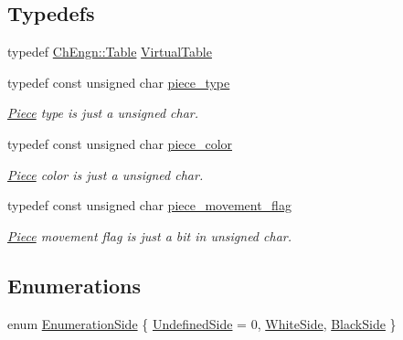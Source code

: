 \subsection*{Typedefs}
\begin{DoxyCompactItemize}
\item 
typedef \hyperlink{classChEngn_1_1Table}{ChEngn::Table} \hyperlink{namespaceChEngn_a5ba229504d25ed1b2086f1df62f6db41}{VirtualTable}
\item 
\hypertarget{namespaceChEngn_a2a35c185f259757a78e937575b8ed483}{
typedef const unsigned char \hyperlink{namespaceChEngn_a2a35c185f259757a78e937575b8ed483}{piece\_\-type}}
\label{namespaceChEngn_a2a35c185f259757a78e937575b8ed483}

\begin{DoxyCompactList}\small\item\em \hyperlink{classChEngn_1_1Piece}{Piece} type is just a unsigned char. \item\end{DoxyCompactList}\item 
\hypertarget{namespaceChEngn_a9c81426c0134a97288a226c122daf62f}{
typedef const unsigned char \hyperlink{namespaceChEngn_a9c81426c0134a97288a226c122daf62f}{piece\_\-color}}
\label{namespaceChEngn_a9c81426c0134a97288a226c122daf62f}

\begin{DoxyCompactList}\small\item\em \hyperlink{classChEngn_1_1Piece}{Piece} color is just a unsigned char. \item\end{DoxyCompactList}\item 
\hypertarget{namespaceChEngn_a491b2eba2f766087f4f28948005ab16a}{
typedef const unsigned char \hyperlink{namespaceChEngn_a491b2eba2f766087f4f28948005ab16a}{piece\_\-movement\_\-flag}}
\label{namespaceChEngn_a491b2eba2f766087f4f28948005ab16a}

\begin{DoxyCompactList}\small\item\em \hyperlink{classChEngn_1_1Piece}{Piece} movement flag is just a bit in unsigned char. \item\end{DoxyCompactList}\end{DoxyCompactItemize}
\subsection*{Enumerations}
\begin{DoxyCompactItemize}
\item 
enum \hyperlink{namespaceChEngn_a680bcca190861d8cee0f8627ce8f9de3}{EnumerationSide} \{ \hyperlink{namespaceChEngn_a680bcca190861d8cee0f8627ce8f9de3a21eec37f5afa6d7b64df3cb2c2098625}{UndefinedSide} =  0, 
\hyperlink{namespaceChEngn_a680bcca190861d8cee0f8627ce8f9de3a1216fa4a94b6a39e924f5965c2f077c8}{WhiteSide}, 
\hyperlink{namespaceChEngn_a680bcca190861d8cee0f8627ce8f9de3a957467874ae046942182f37a5dd95cf1}{BlackSide}
 \}
\end{DoxyCompactItemize}
